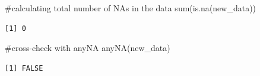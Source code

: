 \documentclass[
  letterpaper,
  DIV=11,
  numbers=noendperiod]{scrartcl}
\newenvironment{Shaded}{\begin{snugshade}}{\end{snugshade}}
\newcommand{\CommentTok}[1]{\textcolor[rgb]{0.37,0.37,0.37}{#1}}
\newcommand{\FunctionTok}[1]{\textcolor[rgb]{0.28,0.35,0.67}{#1}}
\newcommand{\NormalTok}[1]{\textcolor[rgb]{0.00,0.23,0.31}{#1}}
\begin{document}
\begin{Shaded}
\begin{Highlighting}[]
\CommentTok{\#calculating total number of NAs in the data}
\FunctionTok{sum}\NormalTok{(}\FunctionTok{is.na}\NormalTok{(new\_data))}
\end{Highlighting}
\end{Shaded}

\begin{verbatim}
[1] 0
\end{verbatim}

\begin{Shaded}
\begin{Highlighting}[]
\CommentTok{\#cross{-}check with anyNA}
\FunctionTok{anyNA}\NormalTok{(new\_data)}
\end{Highlighting}
\end{Shaded}

\begin{verbatim}
[1] FALSE
\end{verbatim}
\end{document}
